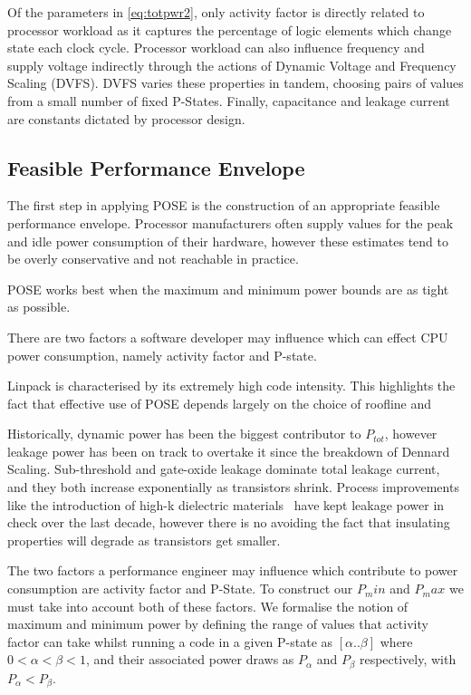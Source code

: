 Of the parameters in \autoref{eq:totpwr2}, only activity factor is directly related to processor workload as it captures the percentage of logic elements which change state each clock cycle.
 Processor workload can also influence frequency and supply voltage indirectly through the actions of Dynamic Voltage and Frequency Scaling (DVFS). 
DVFS varies these properties in tandem, choosing pairs of values from a small number of fixed P-States.
Finally, capacitance and leakage current are constants  dictated by processor design.

\subsection{Feasible Performance Envelope}
The first step in applying POSE is the construction of an appropriate feasible performance envelope.
Processor manufacturers often supply values for the peak and idle power consumption of their hardware, however these estimates tend to be overly conservative and not reachable in practice. 



POSE works best when the maximum and minimum power bounds are as tight as possible.



There are two factors a software developer may influence which can effect CPU power consumption, namely activity factor and P-state.


Linpack is characterised by its extremely high code intensity. 
This highlights the fact that effective use of POSE depends largely on the choice of roofline and 

Historically, dynamic power has been the biggest contributor to $P_{tot}$, however leakage power has been on track to overtake it since the breakdown of Dennard Scaling.  Sub-threshold and gate-oxide leakage dominate total leakage current, and they both increase exponentially as transistors shrink. Process improvements like the introduction of high-k dielectric materials~\cite{jan:2009aa} have kept leakage power in check over the last decade, however there is no avoiding the fact that insulating properties will degrade as transistors get smaller.

The two factors a performance engineer may influence which contribute to power consumption are activity factor and P-State.
To construct our $P_min$ and $P_max$ we must take into account both of these factors.
We formalise the notion of maximum and minimum power by defining the range of values that activity factor can take whilst running a code in a given P-state as $[\alpha  .. \beta]$ where $0 < \alpha < \beta < 1$, and their associated power draws as $P_{\alpha}$ and $P_{\beta}$ respectively, with $P_{\alpha} < P_{\beta}$.

